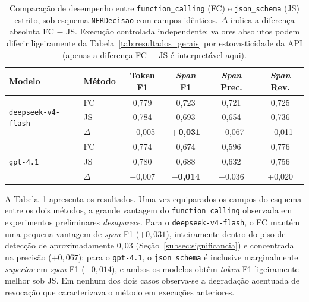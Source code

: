 \begin{table}[ht]
    \centering
    \caption{Comparação de desempenho entre \texttt{function\_calling} (FC) e \texttt{json\_schema} (JS) estrito, sob esquema \texttt{NERDecisao} com campos idênticos. $\Delta$ indica a diferença absoluta FC $-$ JS. Execução controlada independente; valores absolutos podem diferir ligeiramente da Tabela~\ref{tab:resultados_gerais} por estocasticidade da API (apenas a diferença FC $-$ JS é interpretável aqui).}
    \label{tab:saida_estruturada}
    \footnotesize
    \setlength{\tabcolsep}{5pt}
    \begin{tabular}{llcccc}
        \hline
        \textbf{Modelo} & \textbf{Método} & \textbf{Token F1} & \textbf{\textit{Span} F1} & \textbf{\textit{Span} Prec.} & \textbf{\textit{Span} Rev.} \\
        \hline
        \multirow{3}{*}{\texttt{deepseek-v4-flash}}
        & FC       & 0,779 & 0,723 & 0,721 & 0,725 \\
        & JS       & 0,784 & 0,693 & 0,654 & 0,736 \\
        & $\Delta$ & $-$0,005 & \textbf{+0,031} & +0,067 & $-$0,011 \\
        \hline
        \multirow{3}{*}{\texttt{gpt-4.1}}
        & FC       & 0,774 & 0,674 & 0,596 & 0,776 \\
        & JS       & 0,780 & 0,688 & 0,632 & 0,756 \\
        & $\Delta$ & $-$0,007 & \textbf{$-$0,014} & $-$0,036 & +0,020 \\
        \hline
    \end{tabular}
\end{table}

A Tabela~\ref{tab:saida_estruturada} apresenta os resultados. Uma vez equiparados os campos do esquema entre os dois métodos, a grande vantagem do \texttt{function\_calling} observada em experimentos preliminares \emph{desaparece}. Para o \texttt{deepseek-v4-flash}, o FC mantém uma pequena vantagem de \textit{span} F1 ($+0{,}031$), inteiramente dentro do piso de detecção de aproximadamente $0{,}03$ (Seção~\ref{subsec:significancia}) e concentrada na precisão ($+0{,}067$); para o \texttt{gpt-4.1}, o \texttt{json\_schema} é inclusive marginalmente \emph{superior} em \textit{span} F1 ($-0{,}014$), e ambos os modelos obtêm \textit{token} F1 ligeiramente melhor sob JS. Em nenhum dos dois casos observa-se a degradação acentuada de revocação que caracterizava o método em execuções anteriores.

